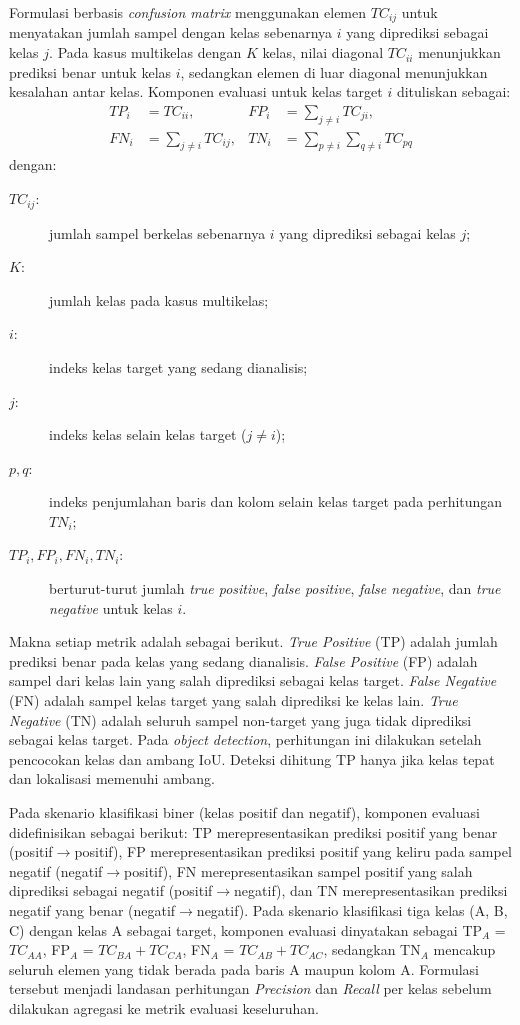 Formulasi berbasis \textit{confusion matrix} menggunakan elemen $TC_{ij}$
untuk menyatakan jumlah sampel dengan kelas sebenarnya $i$ yang diprediksi
sebagai kelas $j$. Pada kasus multikelas dengan $K$ kelas, nilai diagonal
$TC_{ii}$ menunjukkan prediksi benar untuk kelas $i$, sedangkan elemen di luar
diagonal menunjukkan kesalahan antar kelas. Komponen evaluasi untuk kelas
target $i$ dituliskan sebagai:
\begin{equation}
\begin{aligned}
TP_i &= TC_{ii}, & FP_i &= \sum_{j \neq i} TC_{ji}, \\
FN_i &= \sum_{j \neq i} TC_{ij}, & TN_i &= \sum_{p \neq i} \sum_{q \neq i} TC_{pq}
\end{aligned}
\end{equation}
\noindent dengan:
\begin{description}
  \item[$TC_{ij}$:] jumlah sampel berkelas sebenarnya $i$ yang diprediksi sebagai kelas $j$;
  \item[$K$:] jumlah kelas pada kasus multikelas;
  \item[$i$:] indeks kelas target yang sedang dianalisis;
  \item[$j$:] indeks kelas selain kelas target ($j \neq i$);
  \item[$p, q$:] indeks penjumlahan baris dan kolom selain kelas target pada perhitungan $TN_i$;
  \item[$TP_i, FP_i, FN_i, TN_i$:] berturut-turut jumlah \textit{true positive}, \textit{false positive}, \textit{false negative}, dan \textit{true negative} untuk kelas $i$.
\end{description}

Makna setiap metrik adalah sebagai berikut. \textit{True Positive} (TP) adalah
jumlah prediksi benar pada kelas yang sedang dianalisis. \textit{False
Positive} (FP) adalah sampel dari kelas lain yang salah diprediksi sebagai
kelas target. \textit{False Negative} (FN) adalah sampel kelas target yang
salah diprediksi ke kelas lain. \textit{True Negative} (TN) adalah seluruh
sampel non-target yang juga tidak diprediksi sebagai kelas target. Pada
\textit{object detection}, perhitungan ini dilakukan setelah pencocokan kelas
dan ambang IoU. Deteksi dihitung TP hanya jika kelas tepat dan lokalisasi
memenuhi ambang.

Pada skenario klasifikasi biner (kelas positif dan negatif), komponen evaluasi
didefinisikan sebagai berikut: TP merepresentasikan prediksi positif yang benar
(positif$\to$positif), FP merepresentasikan prediksi positif yang keliru pada
sampel negatif (negatif$\to$positif), FN merepresentasikan sampel positif yang
salah diprediksi sebagai negatif (positif$\to$negatif), dan TN
merepresentasikan prediksi negatif yang benar (negatif$\to$negatif). Pada
skenario klasifikasi tiga kelas (A, B, C) dengan kelas A sebagai target,
komponen evaluasi dinyatakan sebagai TP$_A$ = $TC_{AA}$,
FP$_A$ = $TC_{BA}+TC_{CA}$, FN$_A$ = $TC_{AB}+TC_{AC}$, sedangkan TN$_A$
mencakup seluruh elemen yang tidak berada pada baris A maupun kolom A.
Formulasi tersebut menjadi landasan perhitungan \textit{Precision} dan
\textit{Recall} per kelas sebelum dilakukan agregasi ke metrik evaluasi
keseluruhan.

